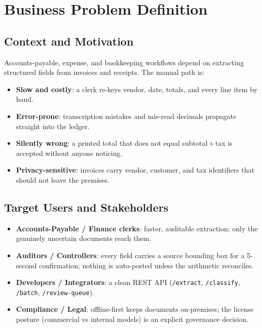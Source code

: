 \documentclass[12pt,a4paper]{article}
\begin{document}
\section{Business Problem Definition}

\subsection{Context and Motivation}

Accounts-payable, expense, and bookkeeping workflows depend on extracting structured
fields from invoices and receipts. The manual path is:
\begin{itemize}
  \item \textbf{Slow and costly}: a clerk re-keys vendor, date, totals, and every line item by hand.
  \item \textbf{Error-prone}: transcription mistakes and mis-read decimals propagate straight into the ledger.
  \item \textbf{Silently wrong}: a printed total that does not equal subtotal\,$+$\,tax is accepted without anyone noticing.
  \item \textbf{Privacy-sensitive}: invoices carry vendor, customer, and tax identifiers that should not leave the premises.
\end{itemize}

\subsection{Target Users and Stakeholders}

\begin{itemize}
  \item \textbf{Accounts-Payable / Finance clerks}: faster, auditable extraction; only the genuinely uncertain documents reach them.
  \item \textbf{Auditors / Controllers}: every field carries a source bounding box for a 5-second confirmation; nothing is auto-posted unless the arithmetic reconciles.
  \item \textbf{Developers / Integrators}: a clean REST API (\texttt{/extract}, \texttt{/classify}, \texttt{/batch}, \texttt{/review-queue}).
  \item \textbf{Compliance / Legal}: offline-first keeps documents on-premises; the license posture (commercial vs internal models) is an explicit governance decision.
\end{itemize}
\end{document}
